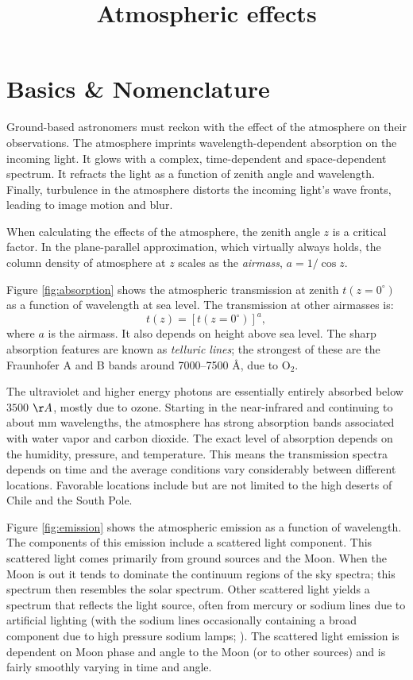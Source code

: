\title{\bf Atmospheric effects}

\section{Basics \& Nomenclature}

Ground-based astronomers must reckon with the effect of the atmosphere
on their observations. The atmosphere imprints wavelength-dependent
absorption on the incoming light. It glows with a complex,
time-dependent and space-dependent spectrum.  It refracts the light as
a function of zenith angle and wavelength. Finally, turbulence in the
atmosphere distorts the incoming light's wave fronts, leading to image
motion and blur.

When calculating the effects of the atmosphere, the zenith angle $z$
is a critical factor. In the plane-parallel approximation, which
virtually always holds, the column density of atmosphere at $z$ scales
as the {\it airmass}, $a = 1 / \cos z$. 

Figure \ref{fig:absorption} shows the atmospheric transmission at
zenith $t(z=0^\circ)$ as a function of wavelength at sea level. The
transmission at other airmasses is:
\begin{equation}
t(z) = [t(z=0^\circ)]^a,
\end{equation}
where $a$ is the airmass. It also depends on height above sea level.
The sharp absorption features are known as {\it telluric lines}; the
strongest of these are the Fraunhofer A and B bands around
7000--7500 \AA, due to O$_2$.

The ultraviolet and higher energy photons are essentially entirely
absorbed below $3500$ $\AA$, mostly due to ozone. Starting in the
near-infrared and continuing to about mm wavelengths, the atmosphere
has strong absorption bands associated with water vapor and carbon
dioxide.  The exact level of absorption depends on the humidity,
pressure, and temperature.  This means the transmission spectra
depends on time and the average conditions vary considerably between
different locations. Favorable locations include but are not limited
to the high deserts of Chile and the South Pole.

Figure \ref{fig:emission} shows the atmospheric emission as a function
of wavelength. The components of this emission include a scattered
light component. This scattered light comes primarily from ground
sources and the Moon. When the Moon is out it tends to dominate the
continuum regions of the sky spectra; this spectrum then resembles the
solar spectrum. Other scattered light yields a spectrum that reflects
the light source, often from mercury or sodium lines due to artificial
lighting (with the sodium lines occasionally containing a broad
component due to high pressure sodium lamps; \citealt{osterbrock76a}).
The scattered light emission is dependent on Moon phase and angle to
the Moon (or to other sources) and is fairly smoothly varying in time
and angle.

